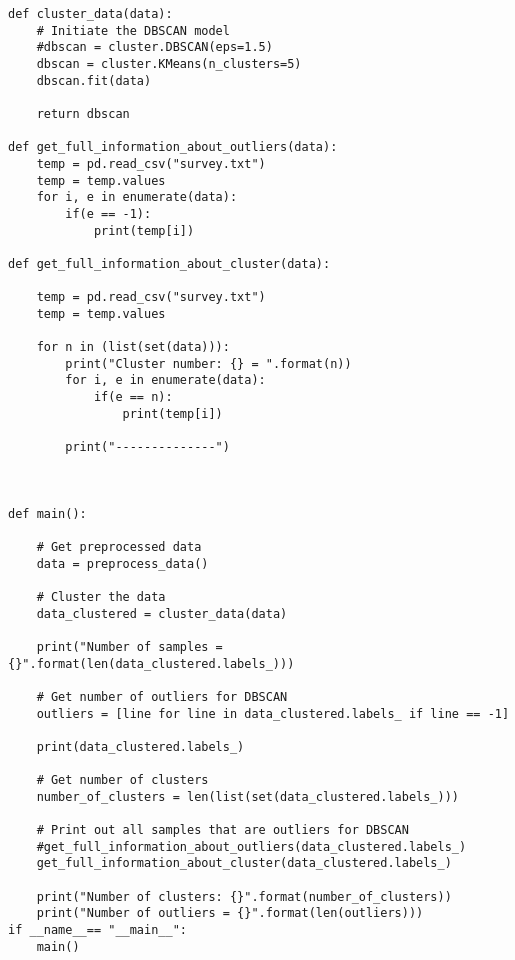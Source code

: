 \documentclass[a4paper]{article}
\begin{document}
\begin{lstlisting}
def cluster_data(data):
    # Initiate the DBSCAN model
    #dbscan = cluster.DBSCAN(eps=1.5)
    dbscan = cluster.KMeans(n_clusters=5)
    dbscan.fit(data)

    return dbscan

def get_full_information_about_outliers(data):
    temp = pd.read_csv("survey.txt")
    temp = temp.values
    for i, e in enumerate(data):
        if(e == -1):
            print(temp[i])

def get_full_information_about_cluster(data):

    temp = pd.read_csv("survey.txt")
    temp = temp.values

    for n in (list(set(data))):
        print("Cluster number: {} = ".format(n))
        for i, e in enumerate(data):
            if(e == n):
                print(temp[i])

        print("--------------")
    
            

def main():
    
    # Get preprocessed data
    data = preprocess_data()

    # Cluster the data
    data_clustered = cluster_data(data)

    print("Number of samples = {}".format(len(data_clustered.labels_)))

    # Get number of outliers for DBSCAN
    outliers = [line for line in data_clustered.labels_ if line == -1]
    
    print(data_clustered.labels_)

    # Get number of clusters
    number_of_clusters = len(list(set(data_clustered.labels_)))
    
    # Print out all samples that are outliers for DBSCAN
    #get_full_information_about_outliers(data_clustered.labels_)
    get_full_information_about_cluster(data_clustered.labels_)

    print("Number of clusters: {}".format(number_of_clusters))
    print("Number of outliers = {}".format(len(outliers)))
if __name__== "__main__":
    main()

\end{lstlisting}

\newpage




\end{document}
